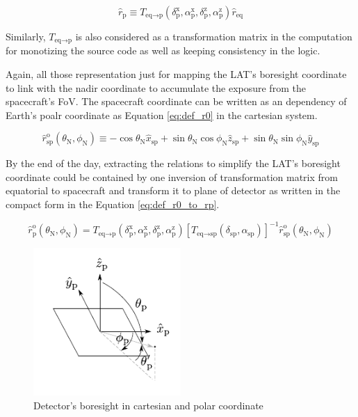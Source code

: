 \begin{equation}
    \hat{r}_\text{p} \equiv T_{\text{eq}\rightarrow\text{p}} (\delta^\text{x}_\text{p}, \alpha^\text{x}_\text{p}, \delta^\text{z}_\text{p}, \alpha^\text{z}_\text{p}) \hat{r}_\text{eq}
    \label{eq:rep_tf_eq_p}
\end{equation}

Similarly, $T_{\text{eq}\rightarrow\text{p}}$ is also considered as 
a transformation matrix in the computation for monotizing the source 
code as well as keeping consistency in the logic.

Again, all those representation just for mapping the LAT's boresight
coordinate to link with the nadir coordinate to accumulate the 
exposure from the spacecraft's FoV. The spacecraft coordinate can be 
written as an dependency of Earth's poalr coordinate as Equation \ref{eq:def_r0}
in the cartesian system.

\begin{equation}
    \hat{r}^\text{o}_\text{sp} (\theta_\text{N}, \phi_\text{N}) \equiv -\cos\theta_\text{N}\hat{x}_\text{sp} + \sin\theta_\text{N}\cos\phi_\text{N}\hat{z}_\text{sp} + \sin\theta_\text{N}\sin\phi_\text{N}\hat{y}_\text{sp}
    \label{eq:def_r0}
\end{equation}

By the end of the day, extracting the relations to simplify the 
LAT's boresight coordinate could be contained by one inversion of 
transformation matrix from equatorial to spacecraft and transform it 
to plane of detector as written in the compact form in the Equation 
\ref{eq:def_r0_to_rp}.

\begin{equation}
    \hat{r}^\text{o}_\text{p} (\theta_\text{N}, \phi_\text{N}) = T_{\text{eq}\rightarrow\text{p}} (\delta^\text{x}_\text{p}, \alpha^\text{x}_\text{p}, \delta^\text{z}_\text{p}, \alpha^\text{z}_\text{p}) \left[T_{\text{eq}\rightarrow\text{sp}} (\delta_\text{sp}, \alpha_\text{sp})\right]^{-1} \hat{r}^\text{o}_\text{sp} (\theta_\text{N}, \phi_\text{N})
    \label{eq:def_r0_to_rp}
\end{equation}

\begin{figure}[h!]
    \centering
    \includegraphics[width=0.5\textwidth]{content/methodology/figures/coord_plane}
    \caption{Detector's boresight in cartesian and polar coordinate}
    \label{fig:tf_lat_pol_car}
\end{figure}

